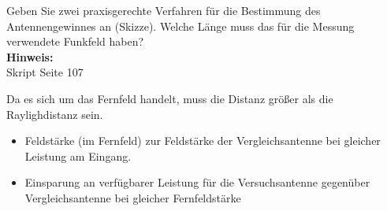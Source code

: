 \begin{question}[section=10,name={Antennengewinn 2},difficulty=,quantity=2,type=thr,tags={20130625}]
	Geben Sie zwei praxisgerechte Verfahren für die Bestimmung des Antennengewinnes an (Skizze). Welche Länge muss das für die Messung verwendete Funkfeld haben?
	\\ \textbf{Hinweis:}\\
	Skript Seite 107
\end{question}
\begin{solution}
	Da es sich um das Fernfeld handelt, muss die Distanz größer als die Raylighdistanz sein.\\
	\begin{itemize}
		\item{Feldstärke (im Fernfeld) zur Feldstärke der Vergleichsantenne bei gleicher Leistung am Eingang.}
		\item{Einsparung an verfügbarer Leistung für die Versuchsantenne gegenüber Vergleichsantenne bei gleicher Fernfeldstärke}
	\end{itemize}
\end{solution}